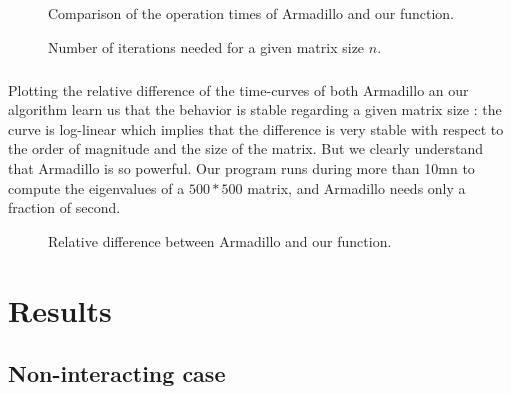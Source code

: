 \documentclass[a4paper, twoside, 11pt]{report}
\theoremstyle{theorem}
\theoremstyle{remark}
\theoremstyle{exemple}
\begin{document}
            \begin{figure}[h!]
		\begin{center}
		    
		    \caption{Comparison of the operation times of Armadillo and our function.}

		\end{center}
	\end{figure}		
           
				
			
	\begin{figure}[h!]
	    \begin{center}
		
	        \caption{Number of iterations needed for a given matrix size $n$.}

	    \end{center}
	\end{figure}
			
	\paragraph{}Plotting the relative difference of the time-curves of both Armadillo an our algorithm learn us that the behavior is stable regarding a given matrix size : the curve is log-linear which implies that the difference is very stable with respect to the order of magnitude and the size of the matrix. But we clearly understand that Armadillo is so powerful. Our program runs during more than 10mn to compute the eigenvalues of a $500*500$ matrix, and Armadillo needs only a fraction of second.
			
	\begin{figure}[h!]
	    \begin{center}
		
		\caption{Relative difference between Armadillo and our function.}
	    \end{center}
	\end{figure}
			
			



\chapter{Results}

    \section{Non-interacting case}
    
\end{document}

